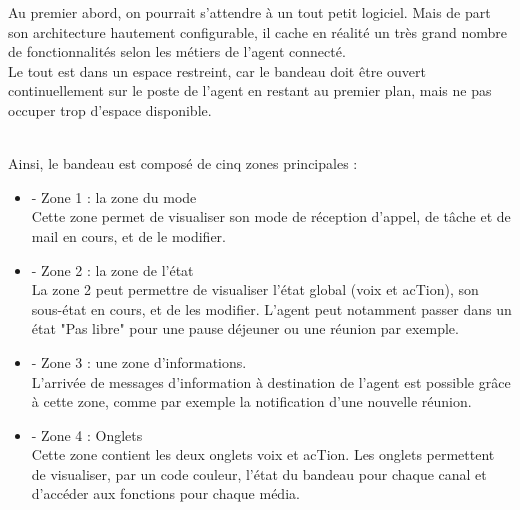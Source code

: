 \documentclass{rapport}
\begin{document}
\begin{minipage}{0.65\textwidth}
Au premier abord, on pourrait s'attendre à un tout petit logiciel. Mais de part son architecture hautement configurable, il cache en réalité un très grand nombre de fonctionnalités selon les métiers de l'agent connecté.\\

Le tout est dans un espace restreint, car le bandeau doit être ouvert continuellement sur le poste de l'agent en restant au premier plan, mais ne pas occuper trop d'espace disponible.  
\end{minipage}
\begin{minipage}{0.25\textwidth}
\raggedright
\end{minipage}
\vspace{10mm} %
\noindent
\\

Ainsi, le bandeau est composé de cinq zones principales :

\vspace{5mm} %
\begin{minipage}{0.25\textwidth}
\end{minipage}
\begin{minipage}{0.65\textwidth}

\begin{itemize}
\item -	Zone 1 : la zone du mode \\
Cette zone permet de visualiser son mode de réception d’appel, de tâche et de mail en cours, et de le modifier.\\

\item -	Zone 2 : la zone de l’état\\
La zone 2 peut permettre de visualiser l’état global (voix et acTion), son sous-état en cours, et de les modifier. L'agent peut notamment passer dans un état "Pas libre" pour une pause déjeuner ou une réunion par exemple.\\

\item -	Zone 3 : une zone d’informations.\\
L'arrivée de messages d'information à destination de l'agent est possible grâce à cette zone, comme par exemple la notification d'une nouvelle réunion. \\

\item -	Zone 4 : Onglets\\
Cette zone contient les deux onglets voix et acTion. 
Les onglets permettent de visualiser, par un code couleur, l’état du bandeau pour chaque canal et d’accéder aux fonctions pour chaque média.
\end{itemize}

\end{minipage}
\vspace{10mm} %
\noindent
\\
\end{document}
